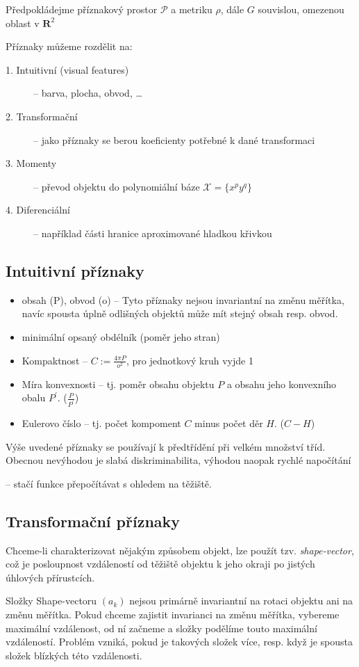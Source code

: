 \def\R{\mathbf{R}}
Předpokládejme příznakový prostor $\mathcal{P}$ a metriku $\rho$, dále $G$ souvislou, omezenou oblast v $\R^2$

Příznaky můžeme rozdělit na:
\begin{description}
\item[1. Intuitivní (visual features)] -- barva, plocha, obvod, \dots
\item[2. Transformační] -- jako příznaky se berou koeficienty potřebné k dané transformaci
\item[3. Momenty ] -- převod objektu do polynomiální báze $\mathcal{X}=\{x^py^q\}$
\item[4. Diferenciální] -- například části hranice aproximované hladkou křivkou
\end{description}

\subsection{Intuitivní příznaky}
\begin{itemize}
\item obsah (P), obvod (o) -- Tyto příznaky nejsou invariantní na změnu měřítka,
navíc spousta úplně odlišných objektů může mít stejný obsah resp. obvod.
\item minimální opsaný obdélník (poměr jeho stran)
\item Kompaktnost -- $C:=\frac{4\pi P}{o^2}$, pro jednotkový kruh vyjde 1
\item Míra konvexnosti -- tj. poměr obsahu objektu $P$ a obsahu jeho konvexního obalu $P^\prime$. ($\frac{P}{P^\prime}$)
\item Eulerovo číslo -- tj. počet kompoment $C$ minus počet děr $H$. ($C-H$)
\end{itemize}
Výše uvedené příznaky se používají k předtřídění při velkém množství tříd. Obecnou nevýhodou je slabá diskriminabilita,
výhodou naopak rychlé napočítání

 -- stačí funkce přepočítávat s ohledem na těžiště.

\subsection{Transformační příznaky}
Chceme-li charakterizovat nějakým způsobem objekt, lze použít tzv. {\em shape-vector},  což je posloupnost vzdáleností
od těžiště objektu k jeho okraji po jistých úhlových přírustcích. 

Složky Shape-vectoru $(a_k)$ nejsou primárně invariantní na rotaci objektu ani na změnu měřítka. Pokud chceme 
zajistit invarianci na změnu měřítka, vybereme maximální vzdálenost, od ní začneme a složky podělíme touto maximální
vzdáleností. Problém vzniká, pokud je takových složek více, resp. když je spousta složek blízkých této vzdálenosti.


